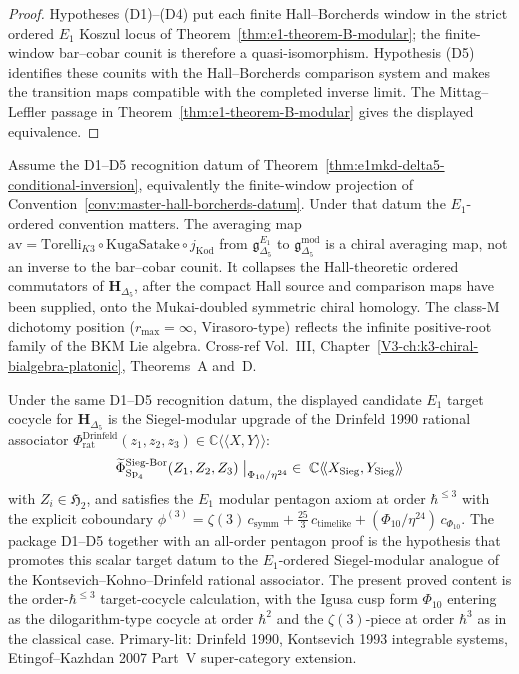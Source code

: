 \begin{proof}
Hypotheses \textup{(D1)--(D4)} put each finite Hall--Borcherds window
in the strict ordered $E_1$ Koszul locus of
Theorem~\ref{thm:e1-theorem-B-modular}; the finite-window
bar--cobar counit is therefore a quasi-isomorphism. Hypothesis
\textup{(D5)} identifies these counits with the Hall--Borcherds
comparison system and makes the transition maps compatible with the
completed inverse limit. The Mittag--Leffler passage in
Theorem~\ref{thm:e1-theorem-B-modular} gives the displayed
equivalence.
\end{proof}

\begin{remark}
\label{rem:e1mkd-1}
Assume the D1--D5 recognition datum of
Theorem~\ref{thm:e1mkd-delta5-conditional-inversion}, equivalently the
finite-window projection of
Convention~\ref{conv:master-hall-borcherds-datum}. Under that datum the
$E_1$-ordered convention matters. The averaging map
$\mathrm{av} = \mathrm{Torelli}_{K3}\circ\mathrm{KugaSatake}\circ j_{\mathrm{Kod}}$
from $\mathfrak g^{E_1}_{\Delta_5}$ to $\mathfrak g^{\mathrm{mod}}_{\Delta_5}$
is a chiral averaging map, not an inverse to the bar--cobar counit.
It collapses the Hall-theoretic ordered commutators of
\(\mathbf H_{\Delta_5}\), after the compact Hall source and comparison maps
have been supplied, onto the Mukai-doubled symmetric chiral
homology. The class-M dichotomy position ($r_{\max}=\infty$,
Virasoro-type) reflects the infinite positive-root family of the BKM
Lie algebra. Cross-ref Vol.~III,
Chapter~\ref{V3-ch:k3-chiral-bialgebra-platonic}, Theorems~A and~D.
\end{remark}

\begin{remark}
\label{rem:e1mkd-2}
Under the same D1--D5 recognition datum, the displayed candidate
\(E_1\) target cocycle for \(\mathbf H_{\Delta_5}\) is the
Siegel-modular upgrade of the Drinfeld 1990 rational associator
$\Phi^{\mathrm{Drinfeld}}_{\mathrm{rat}}(z_1,z_2,z_3) \in \mathbb C\langle\!\langle X,Y\rangle\!\rangle$:
\[
\widetilde\Phi^{\mathrm{Sieg\text{-}Bor}}_{\mathrm{Sp}_4}(Z_1,Z_2,Z_3)\bigm|_{\Phi_{10}/\eta^{24}}
\;\in\; \mathbb C\langle\!\langle X_{\mathrm{Sieg}}, Y_{\mathrm{Sieg}}\rangle\!\rangle
\]
with $Z_i \in \mathfrak H_2$, and satisfies the $E_1$ modular pentagon
axiom at order $\hbar^{\le 3}$ with the explicit coboundary
$\phi^{(3)} = \zeta(3)\, c_{\mathrm{symm}} + \tfrac{25}{3}\, c_{\mathrm{timelike}} + (\Phi_{10}/\eta^{24})\, c_{\Phi_{10}}$.
The package D1--D5 together with an all-order pentagon proof is the
hypothesis that promotes this scalar target datum to the \(E_1\)-ordered
Siegel-modular analogue of the Kontsevich--Kohno--Drinfeld rational
associator.  The present proved content is the order-$\hbar^{\le3}$
target-cocycle calculation, with the Igusa cusp form $\Phi_{10}$ entering as
the dilogarithm-type cocycle at order $\hbar^2$ and the $\zeta(3)$-piece
at order $\hbar^3$ as in the classical case. Primary-lit: Drinfeld 1990,
Kontsevich 1993 integrable systems, Etingof--Kazhdan 2007 Part~V
super-category extension.
\end{remark}


